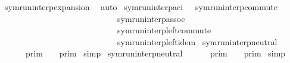 \begin{isabellebody}
%
\isadelimproof
%
\endisadelimproof
%
\isatagproof
{}\isamarkupfalse%
\ symrun{\isacharunderscore}interp{\isacharunderscore}expansion\ \isamarkupfalse%
\ auto%
\endisatagproof
{\isafoldproof}%
%
\isadelimproof
\isanewline
%
\endisadelimproof
\isanewline
{}\isamarkupfalse%
\ symrun{\isacharunderscore}interp{\isacharunderscore}aci\ {\isacharequal}\ \ symrun{\isacharunderscore}interp{\isacharunderscore}commute\isanewline
\ \ \ \ \ \ \ \ \ \ \ \ \ \ \ \ \ \ \ \ \ \ \ \ \ \ \ \ symrun{\isacharunderscore}interp{\isacharunderscore}assoc\isanewline
\ \ \ \ \ \ \ \ \ \ \ \ \ \ \ \ \ \ \ \ \ \ \ \ \ \ \ \ symrun{\isacharunderscore}interp{\isacharunderscore}left{\isacharunderscore}commute\isanewline
\ \ \ \ \ \ \ \ \ \ \ \ \ \ \ \ \ \ \ \ \ \ \ \ \ \ \ \ symrun{\isacharunderscore}interp{\isacharunderscore}left{\isacharunderscore}idem\isanewline
\isanewline
%
\isanewline
{}\isamarkupfalse%
\ symrun{\isacharunderscore}interp{\isacharunderscore}neutral{}{\isacharcolon}\isanewline
\ \ {\isacartoucheopen}{\isasymlbrakk}{\isasymlbrakk}\ {\isacharbrackleft}{\isacharbrackright}\ {\isacharat}\ {\isasymGamma}\ {\isasymrbrakk}{\isasymrbrakk}\isactrlsub p\isactrlsub r\isactrlsub i\isactrlsub m\ {\isacharequal}\ {\isasymlbrakk}{\isasymlbrakk}\ {\isasymGamma}\ {\isasymrbrakk}{\isasymrbrakk}\isactrlsub p\isactrlsub r\isactrlsub i\isactrlsub m{\isacartoucheclose}\isanewline
%
\isadelimproof
%
\endisadelimproof
%
\isatagproof
{}\isamarkupfalse%
\ simp%
\endisatagproof
{\isafoldproof}%
%
\isadelimproof
\isanewline
%
\endisadelimproof
\isanewline
{}\isamarkupfalse%
\ symrun{\isacharunderscore}interp{\isacharunderscore}neutral{}{\isacharcolon}\isanewline
\ \ {\isacartoucheopen}{\isasymlbrakk}{\isasymlbrakk}\ {\isasymGamma}\ {\isacharat}\ {\isacharbrackleft}{\isacharbrackright}\ {\isasymrbrakk}{\isasymrbrakk}\isactrlsub p\isactrlsub r\isactrlsub i\isactrlsub m\ {\isacharequal}\ {\isasymlbrakk}{\isasymlbrakk}\ {\isasymGamma}\ {\isasymrbrakk}{\isasymrbrakk}\isactrlsub p\isactrlsub r\isactrlsub i\isactrlsub m{\isacartoucheclose}\isanewline
%
\isadelimproof
%
\endisadelimproof
%
\isatagproof
{}\isamarkupfalse%
\ simp%
\endisatagproof
{\isafoldproof}%
%
\isadelimproof
%
\endisadelimproof
%
\isadelimdocument
%
\endisadelimdocument
%
\isatagdocument
%
\isamarkuptrue%
%
\endisatagdocument
{\isafolddocument}%
%
\isadelimdocument
%
\endisadelimdocument
%
\begin{isamarkuptext}%

\end{isamarkuptext}
\end{isabellebody}
